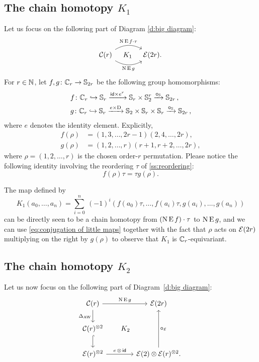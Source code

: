 \subsection{The chain homotopy $K_1$}

Let us focus on the following part of Diagram \eqref{d:big diagram}:
\[
\begin{tikzcd}[column sep=large]
	\cC(r)
	\arrow[r,bend left,"\chains\EE f \cdot \tau"]
	\arrow[r,bend right,"\chains\EE g"']
	\arrow[r,phantom,"K_1"]
	& \BE(2r).
\end{tikzcd}
\]
For $r \in \mathbb{N}$, let $f,g \colon \mathbb{C}_r \to \mathbb{S}_{2r}$ be the following group homomorphisms:
\[
\begin{split}
	&f \colon \mathbb{C}_r \hookrightarrow \mathbb{S}_r \xrightarrow{\mathsf{id} \times e^r} \mathbb{S}_r \times \mathbb{S}_2^r \xrightarrow{\bm{\circ}_{\mathbb{S}}} \mathbb{S}_{2r}\,, \\
	&g \colon \mathbb{C}_r \hookrightarrow \mathbb{S}_r \xrightarrow{e \times \mathrm{D}} \mathbb{S}_2 \times \mathbb{S}_r \times \mathbb{S}_r \xrightarrow{\bm{\circ}_{\mathbb{S}}} \mathbb{S}_{2r}\,,
\end{split}
\]
where $e$ denotes the identity element.
Explicitly,
\begin{align*}
	f(\rho) &= (1,3,\dots,2r-1)(2,4,\dots,2r), \\
	g(\rho) &= (1,2,\dots,r)(r+1,r+2,\dots,2r),
\end{align*}
where $\rho = (1,2,\dots,r)$ is the chosen order-$r$ permutation.
Please notice the following identity involving the reordering $\tau$ of \cref{ss:reordering}:
\begin{equation}\label{eq:conjugation of little maps}
	f(\rho) \tau = \tau g(\rho).
\end{equation}

The map defined by
\[
K_1(a_0,\dots,a_n) =
\sum_{i=0}^n \ (-1)^i (f(a_0) \tau, \dots, f(a_i) \tau, g(a_i), \dots, g(a_n))
\]
can be directly seen to be a chain homotopy from $(\operatorname{N} \operatorname{E} f) \cdot \tau$ to $\operatorname{N} \operatorname{E} g$, and we can use \cref{eq:conjugation of little maps} together with the fact that $\rho$ acts on $\mathcal{E}(2r)$ multiplying on the right by $g(\rho)$ to observe that $K_1$ is $\mathbb{C}_r$-equivariant.

\subsection{The chain homotopy $K_2$}

Let us now focus on the following part of Diagram~\eqref{d:big diagram}:
\[
\begin{tikzcd}
	\cC(r)
	\arrow[r,"\chains\EE g"]
	\arrow[d,"\Delta_{\AW}"']
	\arrow[ddr,phantom,"K_2",shift left=0pt]
	&[15pt] \BE(2r)
	\\
	\cC(r)^{\ot 2}
	\arrow[d,hook] & \\
	\BE(r)^{\ot 2}
	\arrow[r,"e\, \ot\, \id"]
	& \BE(2) \ot \BE(r)^{\ot 2}.
	\arrow[uu,"\bcirc_\BE"']
\end{tikzcd}
\]

